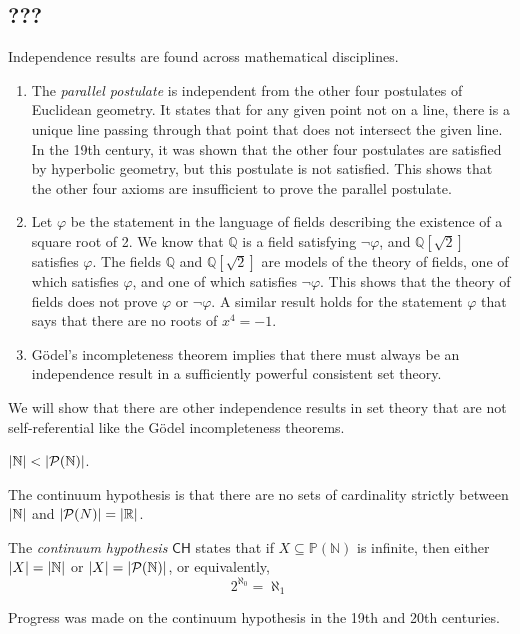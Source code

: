 \subsection{???}
Independence results are found across mathematical disciplines.
\begin{enumerate}
    \item The \emph{parallel postulate} is independent from the other four postulates of Euclidean geometry.
    It states that for any given point not on a line, there is a unique line passing through that point that does not intersect the given line.
    In the 19th century, it was shown that the other four postulates are satisfied by hyperbolic geometry, but this postulate is not satisfied.
    This shows that the other four axioms are insufficient to prove the parallel postulate.
    \item Let \( \varphi \) be the statement in the language of fields describing the existence of a square root of 2.
    We know that \( \mathbb Q \) is a field satisfying \( \neg\varphi \), and \( \mathbb Q[\sqrt{2}] \) satisfies \( \varphi \).
    The fields \( \mathbb Q \) and \( \mathbb Q[\sqrt{2}] \) are models of the theory of fields, one of which satisfies \( \varphi \), and one of which satisfies \( \neg\varphi \).
    This shows that the theory of fields does not prove \( \varphi \) or \( \neg\varphi \).
    A similar result holds for the statement \( \varphi \) that says that there are no roots of \( x^4 = -1 \).
    \item G\"odel's incompleteness theorem implies that there must always be an independence result in a sufficiently powerful consistent set theory.
\end{enumerate}
We will show that there are other independence results in set theory that are not self-referential like the G\"odel incompleteness theorems.
\begin{theorem}[Cantor]
    \( \abs{\mathbb N} < \abs{\mathcal P(\mathbb N)} \).
\end{theorem}
The continuum hypothesis is that there are no sets of cardinality strictly between \( \abs{\mathbb N} \) and \( \abs{\mathcal P(N)} = \abs{\mathbb R} \).
\begin{definition}
    The \emph{continuum hypothesis} \( \mathsf{CH} \) states that if \( X \subseteq \mathbb P(\mathbb N) \) is infinite, then either \( \abs{X} = \abs{\mathbb N} \) or \( \abs{X} = \abs{\mathcal P(\mathbb N)} \), or equivalently,
    \[ 2^{\aleph_0} = \aleph_1 \]
\end{definition}
Progress was made on the continuum hypothesis in the 19th and 20th centuries.
